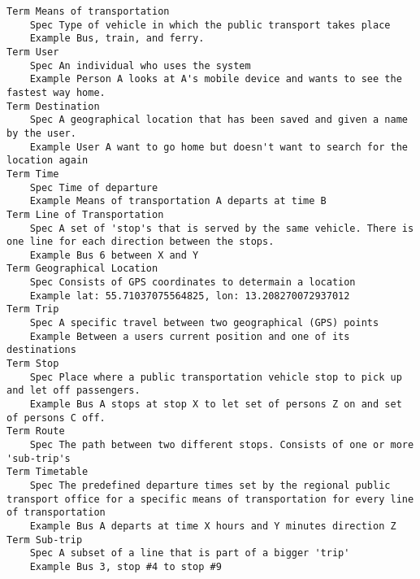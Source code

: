 

\begin{lstlisting}
Term Means of transportation
	Spec Type of vehicle in which the public transport takes place
	Example Bus, train, and ferry.
Term User
	Spec An individual who uses the system
	Example Person A looks at A's mobile device and wants to see the fastest way home.
Term Destination
	Spec A geographical location that has been saved and given a name by the user.
	Example User A want to go home but doesn't want to search for the location again
Term Time
	Spec Time of departure
	Example Means of transportation A departs at time B
Term Line of Transportation
	Spec A set of 'stop's that is served by the same vehicle. There is one line for each direction between the stops.
	Example Bus 6 between X and Y
Term Geographical Location
	Spec Consists of GPS coordinates to determain a location
	Example lat: 55.71037075564825, lon: 13.208270072937012
Term Trip
	Spec A specific travel between two geographical (GPS) points
	Example Between a users current position and one of its destinations
Term Stop
	Spec Place where a public transportation vehicle stop to pick up and let off passengers.
	Example Bus A stops at stop X to let set of persons Z on and set of persons C off.
Term Route
	Spec The path between two different stops. Consists of one or more 'sub-trip's
Term Timetable
	Spec The predefined departure times set by the regional public transport office for a specific means of transportation for every line of transportation
	Example Bus A departs at time X hours and Y minutes direction Z
Term Sub-trip
	Spec A subset of a line that is part of a bigger 'trip'
	Example Bus 3, stop #4 to stop #9

\end{lstlisting}